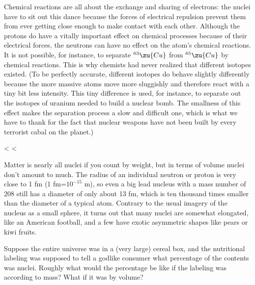         Chemical reactions are all about the exchange and sharing of
        electrons: the nuclei have to sit out this dance because the
        forces of electrical repulsion prevent them from ever
        getting close enough to make contact with each other.
        Although the protons do have a vitally important effect on
        chemical processes because of their electrical forces, the
        neutrons can have no effect on the atom's chemical
        reactions. It is not possible, for instance, to separate
        $^{63}\zu{Cu}$ from $^{65}\zu{Cu}$ by chemical reactions. This is why
        chemists had never realized that different isotopes existed.
        (To be perfectly accurate, different isotopes do behave
        slightly differently because the more massive atoms move
        more sluggishly and therefore react with a tiny bit less
        intensity. This tiny difference is used, for instance, to
        separate out the isotopes of uranium needed to build a
        nuclear bomb. The smallness of this effect makes the
        separation process a slow and difficult one, which is what
        we have to thank for the fact that nuclear weapons have not
        been built by every terrorist cabal on the planet.)

    <%
    <%

        Matter is nearly all nuclei if you count by weight, but in
        terms of volume nuclei don't amount to much. The radius of
        an individual neutron or proton is very close to 1 fm (1
        fm=$10^{-15}$  m), so even a big lead nucleus with a mass
        number of 208 still has a diameter of only about 13 fm,
        which is ten thousand times smaller than the diameter of a
        typical atom. Contrary to the usual imagery of the nucleus
        as a small sphere, it turns out that many nuclei are
        somewhat elongated, like an American football, and a few
        have exotic asymmetric shapes like pears or kiwi fruits.


\startdqs

\begin{dq}
        Suppose the entire universe was in a (very large) cereal
        box, and the nutritional labeling was supposed to tell a
        godlike consumer what percentage of the contents was nuclei.
        Roughly what would the percentage be like if the labeling
        was according to mass? What if it was by volume? 
\end{dq}

